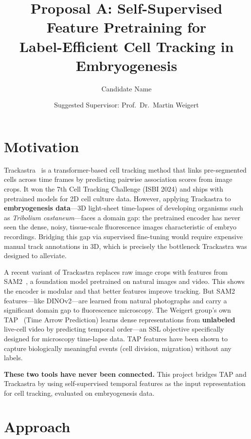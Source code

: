 \documentclass{article}
\title{Proposal A: Self-Supervised Feature Pretraining for\\Label-Efficient Cell Tracking in Embryogenesis}
\author{Candidate Name}
\date{Suggested Supervisor: Prof.\ Dr.\ Martin Weigert}
\begin{document}
\maketitle

\section*{Motivation}

Trackastra~\cite{trackastra} is a transformer-based cell tracking method that links pre-segmented cells across time frames by predicting pairwise association scores from image crops. It won the 7th Cell Tracking Challenge (ISBI 2024) and ships with pretrained models for 2D cell culture data. However, applying Trackastra to \textbf{embryogenesis data}---3D light-sheet time-lapses of developing organisms such as \textit{Tribolium castaneum}---faces a domain gap: the pretrained encoder has never seen the dense, noisy, tissue-scale fluorescence images characteristic of embryo recordings. Bridging this gap via supervised fine-tuning would require expensive manual track annotations in 3D, which is precisely the bottleneck Trackastra was designed to alleviate.

A recent variant of Trackastra replaces raw image crops with features from SAM2~\cite{sam2}, a foundation model pretrained on natural images and video. This shows the encoder is modular and that better features improve tracking. But SAM2 features---like DINOv2---are learned from natural photographs and carry a significant domain gap to fluorescence microscopy. The Weigert group's own TAP~\cite{tap} (Time Arrow Prediction) learns dense representations from \textbf{unlabeled} live-cell video by predicting temporal order---an SSL objective specifically designed for microscopy time-lapse data. TAP features have been shown to capture biologically meaningful events (cell division, migration) without any labels.

\textbf{These two tools have never been connected.} This project bridges TAP and Trackastra by using self-supervised temporal features as the input representation for cell tracking, evaluated on embryogenesis data.

\section*{Approach}
\end{document}
